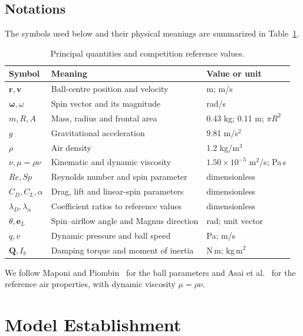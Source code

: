 \documentclass[12pt,letterpaper]{article}
\begin{document}
\subsection{Notations}
The symbols used below and their physical meanings are summarized in Table~\ref{tab:notations}.
\begin{table}[H]\centering\small
\caption{Principal quantities and competition reference values.}\label{tab:notations}
\begin{tabular}{p{}p{}p{}}\toprule
Symbol & Meaning & Value or unit\\\midrule
$\boldsymbol r,\boldsymbol v$ & Ball-centre position and velocity & m; m/s\\
$\boldsymbol\omega,\omega$ & Spin vector and its magnitude & rad/s\\
$m,R,A$ & Mass, radius and frontal area & 0.43 kg; 0.11 m; $\pi R^2$\\
$g$ & Gravitational acceleration & 9.81 m/s$^2$\\
$\rho$ & Air density & 1.2 kg/m$^3$\\
$\nu,\mu=\rho\nu$ & Kinematic and dynamic viscosity & $1.50\times10^{-5}$ m$^2$/s; Pa\,s\\
$Re,Sp$ & Reynolds number and spin parameter & dimensionless\\
$C_D,C_L,\alpha$ & Drag, lift and linear-spin parameters & dimensionless\\
$\lambda_D,\lambda_\alpha$ & Coefficient ratios to reference values & dimensionless\\
$\theta,\boldsymbol e_L$ & Spin--airflow angle and Magnus direction & rad; unit vector\\
$q,v$ & Dynamic pressure and ball speed & Pa; m/s\\
$\boldsymbol Q,I_b$ & Damping torque and moment of inertia & N\,m; kg\,m$^2$\\\bottomrule
\end{tabular}\end{table}
We follow Maponi and Piombin~\cite{maponi} for the ball parameters and Asai et al.\ \cite{asai2007} for the reference air properties, with dynamic viscosity $\mu=\rho\nu$.

\section{Model Establishment}\label{sec:model}
\end{document}
